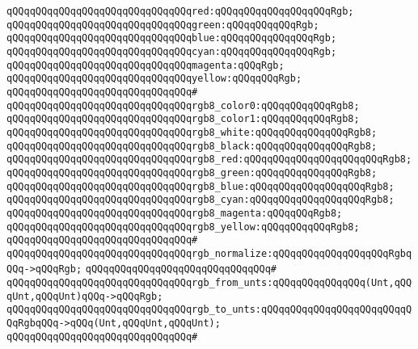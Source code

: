 \verb|qQQqqQQqqQQqqQQqqQQqqQQqqQQqqQQqred:qQQqqQQqqQQqqQQqqQQqRgb;|\newline
\verb|qQQqqQQqqQQqqQQqqQQqqQQqqQQqqQQqgreen:qQQqqQQqqQQqRgb;|\newline
\verb|qQQqqQQqqQQqqQQqqQQqqQQqqQQqqQQqblue:qQQqqQQqqQQqqQQqRgb;|\newline
\verb|qQQqqQQqqQQqqQQqqQQqqQQqqQQqqQQqcyan:qQQqqQQqqQQqqQQqRgb;|\newline
\verb|qQQqqQQqqQQqqQQqqQQqqQQqqQQqqQQqmagenta:qQQqRgb;|\newline
\verb|qQQqqQQqqQQqqQQqqQQqqQQqqQQqqQQqyellow:qQQqqQQqRgb;|\newline
\verb|qQQqqQQqqQQqqQQqqQQqqQQqqQQqqQQq#|\newline
\verb|qQQqqQQqqQQqqQQqqQQqqQQqqQQqqQQqrgb8_color0:qQQqqQQqqQQqRgb8;|\newline
\verb|qQQqqQQqqQQqqQQqqQQqqQQqqQQqqQQqrgb8_color1:qQQqqQQqqQQqRgb8;|\newline
\verb|qQQqqQQqqQQqqQQqqQQqqQQqqQQqqQQqrgb8_white:qQQqqQQqqQQqqQQqRgb8;|\newline
\verb|qQQqqQQqqQQqqQQqqQQqqQQqqQQqqQQqrgb8_black:qQQqqQQqqQQqqQQqRgb8;|\newline
\verb|qQQqqQQqqQQqqQQqqQQqqQQqqQQqqQQqrgb8_red:qQQqqQQqqQQqqQQqqQQqqQQqRgb8;|\newline
\verb|qQQqqQQqqQQqqQQqqQQqqQQqqQQqqQQqrgb8_green:qQQqqQQqqQQqqQQqRgb8;|\newline
\verb|qQQqqQQqqQQqqQQqqQQqqQQqqQQqqQQqrgb8_blue:qQQqqQQqqQQqqQQqqQQqRgb8;|\newline
\verb|qQQqqQQqqQQqqQQqqQQqqQQqqQQqqQQqrgb8_cyan:qQQqqQQqqQQqqQQqqQQqRgb8;|\newline
\verb|qQQqqQQqqQQqqQQqqQQqqQQqqQQqqQQqrgb8_magenta:qQQqqQQqRgb8;|\newline
\verb|qQQqqQQqqQQqqQQqqQQqqQQqqQQqqQQqrgb8_yellow:qQQqqQQqqQQqRgb8;|\newline
\verb|qQQqqQQqqQQqqQQqqQQqqQQqqQQqqQQq#|\newline
\verb|qQQqqQQqqQQqqQQqqQQqqQQqqQQqqQQqrgb_normalize:qQQqqQQqqQQqqQQqqQQqRgbqQQq->qQQqRgb;|\newline
\verb|qQQqqQQqqQQqqQQqqQQqqQQqqQQqqQQq#|\newline
\verb|qQQqqQQqqQQqqQQqqQQqqQQqqQQqqQQqrgb_from_unts:qQQqqQQqqQQqqQQq(Unt,qQQqUnt,qQQqUnt)qQQq->qQQqRgb;|\newline
\verb|qQQqqQQqqQQqqQQqqQQqqQQqqQQqqQQqrgb_to_unts:qQQqqQQqqQQqqQQqqQQqqQQqqQQqRgbqQQq->qQQq(Unt,qQQqUnt,qQQqUnt);|\newline
\verb|qQQqqQQqqQQqqQQqqQQqqQQqqQQqqQQq#|\newline
